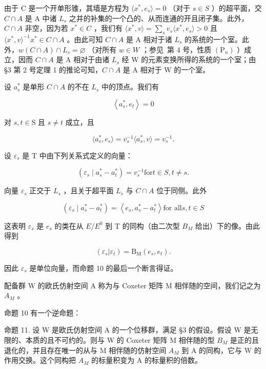 由于 C 是一个开单形锥，其墙是方程为 \(\langle x^{*}, e_{s} \rangle = 0\) （对于 \(s \in S\) ）的超平面，交 \(C \cap A\) 是 A 中诸 \(L_{s}\) 之并的补集的一个凸的、从而连通的开且闭子集。此外，\(C \cap A\) 非空，因为若 \(x^{*} \in C\) ，我们有 \(\langle x^{*}, v \rangle = \sum_{s} v_{s} \langle x^{*}, e_{s} \rangle > 0\) 且 \(\langle x^{*}, v \rangle^{-1} x^{*} \in C \cap A\) 。由此可知 \(C \cap A\) 是 A 相对于诸 \(L_{s}\) 的系统的一个室。此外，\(w(C \cap A) \cap L_{s} = \varnothing\) （对所有 \(w \in W\) ；参见~第 4 号，性质 \((\mathrm{P}_{n})\) ）成立，因而 \(C \cap A\) 是 A 相对于由诸 \(L_{s}\) 经 W 的元素变换所得的系统的一个室；由 §3 第 2 号定理 1 的推论可知，\(C \cap A\) 是 A 相对于 W 的一个室。

设 \(a_{s}^{*}\) 是单形 \(C \cap A\) 的不在 \(L_{s}\) 中的顶点。我们有

\[
\left\langle a _ {s} ^ {*}, e _ {t} \right\rangle = 0
\]

对 \(s,t\in \mathrm{S}\) 且 \(s\neq t\) 成立，且

\[
\langle a _ {s} ^ {*}, e _ {s} \rangle = v _ {s} ^ {- 1} \langle a _ {s} ^ {*}, v \rangle = v _ {s} ^ {- 1}.
\]

设 \(\varepsilon_{s}\) 是 T 中由下列关系式定义的向量：

\[
\left(\varepsilon_ {s} \mid a _ {s} ^ {*} - a _ {t} ^ {*}\right) = v _ {s} ^ {- 1} \text {for} t \in S, t \neq s.
\]

向量 \(\varepsilon_{s}\) 正交于 \(L_{s}\) ，且关于超平面 \(L_{s}\) 与 \(C \cap A\) 位于同侧。此外

\[
\left(\varepsilon_ {s} \mid a _ {s} ^ {*} - a _ {t} ^ {*}\right) = \left\langle e _ {s}, a _ {s} ^ {*} - a _ {t} ^ {*} \right\rangle \text {for all} s, t \in S
\]

这表明 \(\varepsilon_{s}\) 是 \(e_{s}\) 的类在从 \(E/E^{0}\) 到 T 的同构（由二次型 \(B_{M}\) 给出）下的像。由此得到

\[
(\varepsilon_ {s} | \varepsilon_ {t}) = \mathrm{B} _ {\mathrm{M}} (e _ {s}, e _ {t}).
\]

因此 \(\varepsilon_{s}\) 是单位向量，而命题 10 的最后一个断言得证。

配备群 W 的欧氏仿射空间 A 称为与 Coxeter 矩阵 M 相伴随的空间，我们记之为 \(A_{M}\) 。

命题 10 有一个逆命题：

命题 11. 设 W 是欧氏仿射空间 A 的一个位移群，满足 §3 的假设。假设 W 是无限的、本质的且不可约的。则与 W 的 Coxeter 矩阵 M 相伴随的型 \(B_{M}\) 是正的且退化的，并且存在唯一的从与 M 相伴随的仿射空间 \(A_{M}\) 到 A 的同构，它与 W 的作用交换。这个同构把 \(A_{M}\) 的标量积变为 A 的标量积的倍数。

